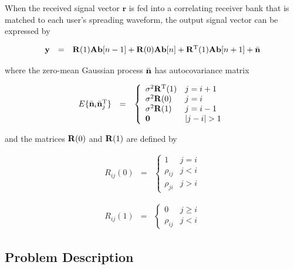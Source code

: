 \documentclass[a4paper,11pt,fleqn]{article}
\newcommand{\br}{{\mathbf r}}
\newcommand{\bA}{{\mathbf A}}
\newcommand{\bb}{{\bf b}}
\newcommand{\bn}{{\bf n}}
\newcommand{\by}{{\bf y}}
\newcommand{\bR}{{\bf R}}
\begin{document}
When the received signal vector $\br$ is fed into a correlating
receiver bank that is matched to each user's spreading waveform,
the output signal vector can be expressed by

\begin{equation}
\begin{array}{rcl}
\by&=&\bR(1)\bA\bb[n-1]+\bR(0)\bA\bb[n]+\bR^{\rm
T}(1)\bA\bb[n+1]+\bar{\bn}
\end{array}
\end{equation}

\noindent where the zero-mean Gaussian process $\bar{\bn}$ has
autocovariance matrix

\begin{equation}
\begin{array}{rcl}
E\{\bar{\bn}_i\bar{\bn}_j^{\rm T}\}&=&\left\{
\begin{array}{ll}
\sigma^2\bR^{\rm T}(1)&j=i+1\\ \sigma^2\bR(0)&j=i\\
\sigma^2\bR(1)&j=i-1\\ \mathbf{0}&|j-i|>1
\end{array}\right.
\end{array}
\end{equation}

\noindent and the matrices $\bR(0)$ and $\bR(1)$ are defined by

\begin{equation}
\begin{array}{rcl}
R_{ij}(0)&=&\left\{
\begin{array}{ll}
1&j=i\\ \rho_{ij}&j<i\\ \rho_{ji}&j>i
\end{array}\right.
\end{array}
\end{equation}

\begin{equation}
\begin{array}{rcl}
R_{ij}(1)&=&\left\{
\begin{array}{ll}
0&j\geq i\\ \rho_{ij}&j<i
\end{array}\right.
\end{array}
\end{equation}

\subsection{Problem Description}
\end{document}
